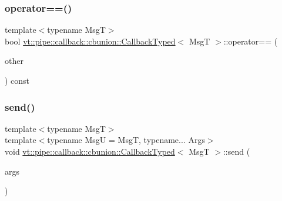 \mbox{\label{structvt_1_1pipe_1_1callback_1_1cbunion_1_1_callback_typed_a8ce2b5aa8087f7ff59e90c92d4d48c0f}} 
\subsubsection{\texorpdfstring{operator==()}{operator==()}\hspace{0.1cm}{\footnotesize\ttfamily [2/2]}}
{\footnotesize\ttfamily template$<$typename MsgT$>$ \\
bool \hyperlink{structvt_1_1pipe_1_1callback_1_1cbunion_1_1_callback_typed}{vt\+::pipe\+::callback\+::cbunion\+::\+Callback\+Typed}$<$ MsgT $>$\+::operator== (\begin{DoxyParamCaption}\item[{\hyperlink{structvt_1_1pipe_1_1callback_1_1cbunion_1_1_callback_raw_base_single}{Callback\+Raw\+Base\+Single} const \&}]{other }\end{DoxyParamCaption}) const\hspace{0.3cm}{\ttfamily [inline]}}

\mbox{\label{structvt_1_1pipe_1_1callback_1_1cbunion_1_1_callback_typed_ad4cfe4ed3a311c21a596ca5d97bc8858}} 
\subsubsection{\texorpdfstring{send()}{send()}\hspace{0.1cm}{\footnotesize\ttfamily [1/3]}}
{\footnotesize\ttfamily template$<$typename MsgT$>$ \\
template$<$typename MsgU  = MsgT, typename... Args$>$ \\
void \hyperlink{structvt_1_1pipe_1_1callback_1_1cbunion_1_1_callback_typed}{vt\+::pipe\+::callback\+::cbunion\+::\+Callback\+Typed}$<$ MsgT $>$\+::send (\begin{DoxyParamCaption}\item[{Args...}]{args }\end{DoxyParamCaption})\hspace{0.3cm}{\ttfamily [inline]}}

